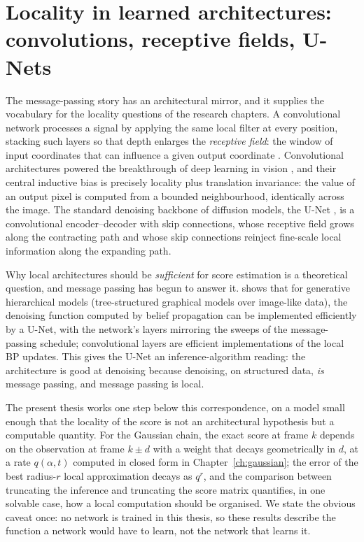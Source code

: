 \section{Locality in learned architectures: convolutions, receptive
fields, U-Nets}\label{sec:cnn-locality}

The message-passing story has an architectural mirror, and it supplies
the vocabulary for the locality questions of the research chapters. A
convolutional network processes a signal by applying the same local
filter at every position, stacking such layers so that depth enlarges
the \emph{receptive field}: the window of input coordinates that can
influence a given output coordinate \citep{lecun2015deep}. Convolutional
architectures powered the breakthrough of deep learning in vision
\citep{krizhevsky2012imagenet}, and their central inductive bias is
precisely locality plus translation invariance: the value of an output
pixel is computed from a bounded neighbourhood, identically across the
image. The standard denoising backbone of diffusion models, the U-Net
\citep{ronneberger2015unet, ho2020denoising}, is a convolutional
encoder--decoder with skip connections, whose receptive field grows
along the contracting path and whose skip connections reinject
fine-scale local information along the expanding path.

Why local architectures should be \emph{sufficient} for score estimation
is a theoretical question, and message passing has begun to answer it.
\citet{mei2024unets} shows that for generative hierarchical models
(tree-structured graphical models over image-like data), the denoising
function computed by belief propagation can be implemented efficiently
by a U-Net, with the network's layers mirroring the sweeps of the
message-passing schedule; convolutional layers are efficient
implementations of the local BP updates. This gives the U-Net an
inference-algorithm reading: the architecture is good at denoising
because denoising, on structured data, \emph{is} message passing, and
message passing is local.

The present thesis works one step below this correspondence, on a model
small enough that the locality of the score is not an architectural
hypothesis but a computable quantity. For the Gaussian chain, the exact
score at frame $k$ depends on the observation at frame $k \pm d$ with a
weight that decays geometrically in $d$, at a rate $q(\alpha, t)$
computed in closed form in Chapter~\ref{ch:gaussian}; the error of the
best radius-$r$ local approximation decays as $q^r$, and the comparison
between truncating the inference and truncating the score matrix
quantifies, in one solvable case, how a local computation should be
organised. We state the obvious caveat once: no network is trained in
this thesis, so these results describe the function a network would have
to learn, not the network that learns it.
